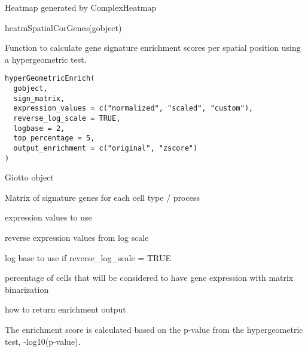 \documentclass[a4paper]{book}
\begin{document}
%
\begin{Value}
Heatmap generated by ComplexHeatmap
\end{Value}
%
\begin{Examples}
\begin{ExampleCode}
    heatmSpatialCorGenes(gobject)
\end{ExampleCode}
\end{Examples}
%
\begin{Description}\relax
Function to calculate gene signature enrichment scores per spatial position using a hypergeometric test.
\end{Description}
%
\begin{Usage}
\begin{verbatim}
hyperGeometricEnrich(
  gobject,
  sign_matrix,
  expression_values = c("normalized", "scaled", "custom"),
  reverse_log_scale = TRUE,
  logbase = 2,
  top_percentage = 5,
  output_enrichment = c("original", "zscore")
)
\end{verbatim}
\end{Usage}
%
\begin{Arguments}
\begin{ldescription}
\item[\code{gobject}] Giotto object

\item[\code{sign\_matrix}] Matrix of signature genes for each cell type / process

\item[\code{expression\_values}] expression values to use

\item[\code{reverse\_log\_scale}] reverse expression values from log scale

\item[\code{logbase}] log base to use if reverse\_log\_scale = TRUE

\item[\code{top\_percentage}] percentage of cells that will be considered to have gene expression with matrix binarization

\item[\code{output\_enrichment}] how to return enrichment output
\end{ldescription}
\end{Arguments}
%
\begin{Details}\relax
The enrichment score is calculated based on the p-value from the
hypergeometric test, -log10(p-value).
\end{Details}
\end{document}
